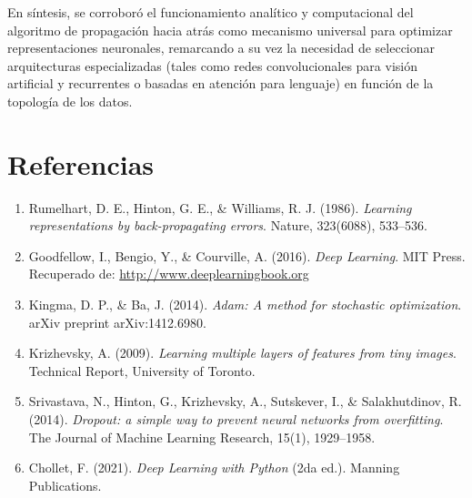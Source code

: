 \documentclass[12pt]{article}
\begin{document}
En síntesis, se corroboró el funcionamiento analítico y computacional del algoritmo de propagación hacia atrás como mecanismo universal para optimizar representaciones neuronales, remarcando a su vez la necesidad de seleccionar arquitecturas especializadas (tales como redes convolucionales para visión artificial y recurrentes o basadas en atención para lenguaje) en función de la topología de los datos.

\newpage
\section{Referencias}
\begin{enumerate}
	\item Rumelhart, D. E., Hinton, G. E., \& Williams, R. J. (1986). \textit{Learning representations by back-propagating errors}. Nature, 323(6088), 533--536.
	\item Goodfellow, I., Bengio, Y., \& Courville, A. (2016). \textit{Deep Learning}. MIT Press. Recuperado de: \url{http://www.deeplearningbook.org}
	\item Kingma, D. P., \& Ba, J. (2014). \textit{Adam: A method for stochastic optimization}. arXiv preprint arXiv:1412.6980.
	\item Krizhevsky, A. (2009). \textit{Learning multiple layers of features from tiny images}. Technical Report, University of Toronto.
	\item Srivastava, N., Hinton, G., Krizhevsky, A., Sutskever, I., \& Salakhutdinov, R. (2014). \textit{Dropout: a simple way to prevent neural networks from overfitting}. The Journal of Machine Learning Research, 15(1), 1929--1958.
	\item Chollet, F. (2021). \textit{Deep Learning with Python} (2da ed.). Manning Publications.
\end{enumerate}
\end{document}
